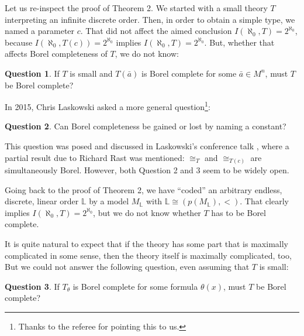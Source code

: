 \documentclass[12pt]{amsart}
\theoremstyle{definition}
\newtheorem{Question}{Question}
\begin{document}
\smallskip
Let us re-inspect the proof of Theorem 2. We started with a small theory $T$ interpreting an infinite discrete order.
Then, in order to obtain a simple type, we named a parameter $c$. That did not affect the aimed conclusion $I(\aleph_0,T)=2^{\aleph_0}$, because $I(\aleph_0,T(c))=2^{\aleph_0}$ implies $I(\aleph_0,T)=2^{\aleph_0}$. But, whether that affects Borel completeness of $T$, we do not know:

\begin{Question}
If $T$ is small and $T(\bar a)$ is Borel complete for some  $\bar a\in M^n$, must $T$ be Borel complete?
\end{Question}

In 2015, Chris Laskowski asked a more general question\footnote{Thanks to the referee for pointing this to us.}:

\begin{Question}
Can Borel completeness be gained or lost by naming a constant?
\end{Question}

This question was posed and discussed in Laskowski's conference talk \cite{Chris}, where a partial result due to Richard Rast was mentioned:  $\cong_T$ and $\cong_{T(c)}$ are simultaneously Borel. However, both Question 2 and 3 seem to be widely open. 
 

Going back to the proof of Theorem 2, we have ``coded'' an arbitrary endless, discrete, linear order $\mathbb L$ by a model $M_{\mathbb L}$ with $\mathbb L\cong (p(M_{\mathbb L}),<)$. That clearly implies $I(\aleph_0,T)=2^{\aleph_0}$, but we do not know whether $T$ has to be Borel complete.


It is quite natural to expect that if the theory has  some part that is maximally complicated in some sense, then the theory itself is maximally complicated, too, 
But we could not answer the following question, even assuming that $T$ is small:


 \begin{Question}
If $T_{\theta}$  is Borel complete for some formula $\theta(x)$, must $T$ be Borel complete?
\end{Question}



  
\end{document}

